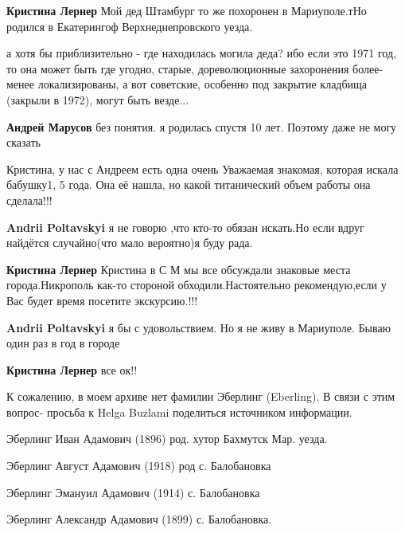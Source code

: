 \begin{itemize} %
\textbf{Кристина Лернер} Мой дед Штамбург то же похоронен в Мариуполе.тНо родился в Екатерингоф Верхнеднепровского уезда.


а хотя бы приблизительно - где находилась могила деда? ибо если это 1971 год,
то она может быть где угодно, старые, дореволюционные захоронения более-менее
локализированы, а вот советские, особенно под закрытие кладбища (закрыли в
1972), могут быть везде...

\begin{itemize} %
\textbf{Андрей Марусов} без понятия. я родилась спустя 10 лет. Поэтому даже не могу сказать
\end{itemize} %


Кристина, у нас с Андреем есть одна очень Уважаемая знакомая, которая искала бабушку1, 5 года. Она её нашла, но какой титанический объем работы она сделала!!!

\begin{itemize} %
\textbf{Andrii Poltavskyi} я не говорю ,что кто-то обязан искать.Но если вдруг найдётся случайно(что мало вероятно)я буду рада.

\textbf{Кристина Лернер} Кристина в С М мы все обсуждали знаковые места города.Никрополь как-то стороной обходили.Настоятельно рекомендую,если у Вас будет время посетите экскурсию.!!!

\textbf{Andrii Poltavskyi} я бы с удовольствием. Но я не живу в Мариуполе. Бываю один раз в год в городе

\textbf{Кристина Лернер} все ок!!

\end{itemize} %

\end{itemize} %


К сожалению, в моем архиве нет фамилии Эберлинг (Eberling). В связи с этим
вопрос- просьба к Helga Buzlami поделиться источником информации.


Эберлинг Иван Адамович (1896) род. хутор Бахмутск Мар. уезда.\par
Эберлинг Август Адамович (1918) род с. Балобановка\par
Эберлинг Эмануил Адамович (1914) с. Балобановка\par
Эберлинг Александр Адамович (1899) с. Балобановка.\par

